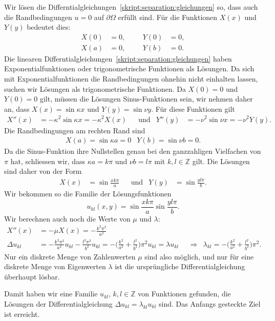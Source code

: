 Wir lösen die Differntialgleichungen~\eqref{skript:separation:gleichungen}
so, dass auch die Randbedingungen $u=0$ auf $\partial\Omega$ erfüllt sind.
Für die Funktionen $X(x)$ und $Y(y)$ bedeutet dies:
\[
\begin{aligned}
X(0)&=0,&&& Y(0) &= 0,\\
X(a)&=0,&&& Y(b) &= 0.
\end{aligned}
\]
Die linearen Differntialgleichungen~\eqref{skript:separation:gleichungen}
haben Exponentialfunktionen oder trigonometrische Funktionen als
Lösungen.
Da sich mit Exponentialfunktionen die Randbedingungen ohnehin nicht
einhalten lassen, suchen wir Lösungen als trigonometrische Funktionen.
Da $X(0)=0$ und $Y(0)=0$ gilt, müssen die Lösungen Sinus-Funktionen sein,
wir nehmen daher an, dass $X(x)=\sin \kappa x$ und $Y(y)=\sin \nu y$.
Für diese Funktionen gilt
\[
\begin{aligned}
X''(x) &= -\kappa^2\sin \kappa x = -\kappa^2 X(x)
&&\text{und}&
Y''(y) &= -\nu^2\sin \nu x = -\nu^2 Y(y).
\end{aligned}
\]
Die Randbedingungen am rechten Rand sind
\[
\begin{aligned}
X(a) = \sin \kappa a = 0
&
Y(b) = \sin \nu b = 0.
\end{aligned}
\]
Da die Sinus-Funktion ihre Nullstellen genau bei den ganzzahligen Vielfachen
von $\pi$ hat, schliessen wir, dass $\kappa a = k\pi$ und $\nu b = l\pi$
mit $k,l\in\mathbb Z$ gilt.
Die Lösungen sind daher von der Form
\[
\begin{aligned}
X(x) &= \sin \frac{xk\pi}{a}
&
&\text{und}
&
Y(y) &= \sin\frac{yl\pi}{b}.
\end{aligned}
\]
Wir bekommen so die Familie der Lösungsfunktionen
\[
u_{kl}(x,y) = \sin \frac{xk\pi}{a} \sin\frac{yl\pi}{b}.
\]
Wir berechnen auch noch die Werte von $\mu$ und $\lambda$:
\begin{align*}
X''(x)
&=
-\mu X(x) = -\frac{k^2\pi^2}{a^2}
\\
\Delta u_{kl}
&=
-\frac{k^2\pi^2}{a^2} u_{kl}
-\frac{l^2\pi^2}{b^2} u_{kl}
=
-\biggl(\frac{k^2}{a^2}+\frac{l^2}{b^2}\biggr)\pi^2 u_{kl}
=
\lambda  u_{kl}
&&\Rightarrow&
\lambda_{kl} = - \biggl(\frac{k^2}{a^2}+\frac{l^2}{b^2}\biggr)\pi^2.
\end{align*}
Nur ein diskrete Menge von Zahlenwerten $\mu$ sind also möglich, und nur 
für eine diskrete Menge von Eigenwerten $\lambda$ ist die ursprüngliche 
Differentialgleichung überhaupt lösbar.

Damit haben wir eine Familie $u_{kl}$, $k,l\in\mathbb Z$ von Funktionen
gefunden, die Lösungen der Differentialgleichung
$\Delta u_{kl}=\lambda_{kl} u_{kl}$ sind.
Das Anfangs gesteckte Ziel ist erreicht.

